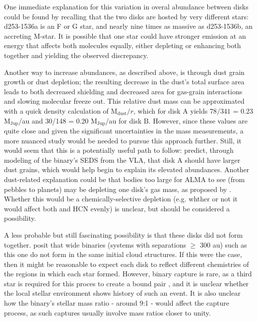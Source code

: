 One immediate explanation for this variation in overal abundance between disks could be found by recalling that the two disks are hosted by very different stars: d253-1536a is an F or G star, and nearly nine times as massive as d253-1536b, an accreting M-star. It is possible that one star could have stronger emission at an energy that affects both molecules equally, either depleting or enhancing both together and yielding the observed discrepancy.


Another way to increase abundances, as described above, is through dust grain growth or dust depletion; the resulting decrease in the dust's total surface area leads to both decreased shielding and decreased area for gas-grain interactions and slowing molecular freeze out. This relative dust mass can be approximated with a quick density calculation of M$_\text{dust}/r$, which for disk A yields $78/341$ = 0.23 M$_\text{Jup}$/au and 30/148 = 0.20 M$_\text{Jup}$/au for disk B. However, since these values are quite close and given the significant uncertainties in the mass measurements, a more nuanced study would be needed to pursue this approach further. Still, it would seem that this is a potentially useful path to follow: \citet{Ricci2011} predict, through modeling of the binary's SEDS from the VLA, that disk A should have larger dust grains, which would help begin to explain its elevated abundances. Another dust-related explanation could be that bodies too large for ALMA to see (from pebbles to planets) may be depleting one disk's gas mass, as proposed by \citet{Miotello2016}. Whether this would be a chemically-selective depletion (e.g. whther or not it would affect both \hco and HCN evenly) is unclear, but should be considered a possibility.


A less probable but still fascinating possibility is that these disks did not form together. \citet{Williams2014} posit that wide binaries (systems with separations $\geq$ 300 au) such as this one do not form in the same initial cloud structures. If this were the case, then it might be reasonable to expect each disk to reflect different chemistries of the regions in which each star formed. However, binary capture is rare, as a third star is required for this proces to create a bound pair \citep[e.g.][]{Mansbach1970}, and it is unclear whether the local stellar environment shows history of such an event. It is also unclear how the binary's stellar mass ratio - around 9:1 - would affect the capture process, as such captures usually involve mass ratios closer to unity.


